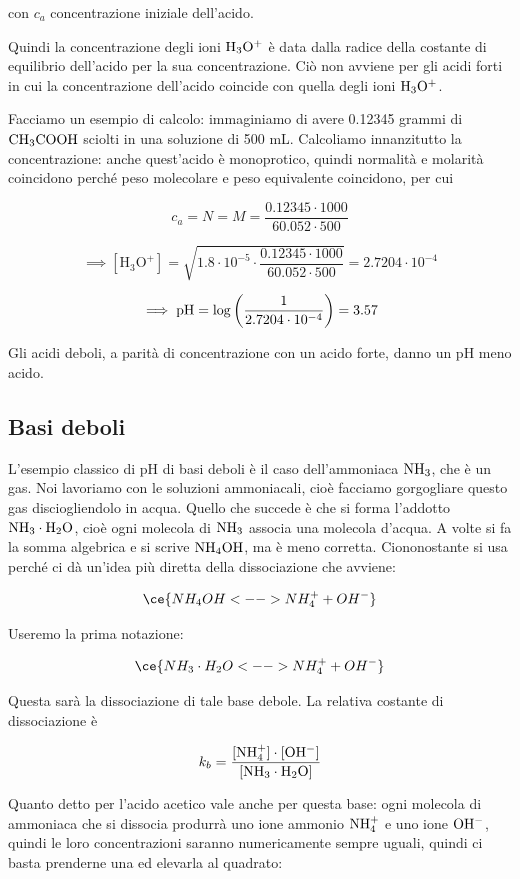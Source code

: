 con $c_a$ concentrazione iniziale dell'acido.

Quindi la concentrazione degli ioni $\rm H_3O^+$ è data dalla radice della costante di equilibrio dell'acido per la sua concentrazione. Ciò non avviene per gli acidi forti in cui la concentrazione dell'acido coincide con quella degli ioni $\rm H_3O^+$.

Facciamo un esempio di calcolo: immaginiamo di avere 0.12345 grammi di $\rm CH_3COOH$ sciolti in una soluzione di 500 mL. Calcoliamo innanzitutto la concentrazione: anche quest'acido è monoprotico, quindi normalità e molarità coincidono perché peso molecolare e peso equivalente coincidono, per cui

$$c_a=N=M=\frac{0.12345 \cdot 1000}{60.052 \cdot 500}$$

$$\implies [\text{H}_3\text{O}^+]=\sqrt{1.8 \cdot 10^{-5} \cdot \frac{0.12345 \cdot 1000}{60.052 \cdot 500}}=2.7204 \cdot 10^{-4}$$

$$\implies \rm pH=\log \left( \frac{1}{2.7204 \cdot 10^{-4}} \right)=3.57$$

Gli acidi deboli, a parità di concentrazione con un acido forte, danno un pH meno acido. 

\subsection{Basi deboli}

L'esempio classico di pH di basi deboli è il caso dell'ammoniaca $\rm NH_3$, che è un gas. Noi lavoriamo con le soluzioni ammoniacali, cioè facciamo gorgogliare questo gas disciogliendolo in acqua. Quello che succede è che si forma l'addotto $\rm NH_3 \cdot H_2O$, cioè ogni molecola di $\rm NH_3$ associa una molecola d'acqua. A volte si fa la somma algebrica e si scrive $\rm NH_4OH$, ma è meno corretta. Ciononostante si usa perché ci dà un'idea più diretta della dissociazione che avviene:

$$\ce{NH_4OH <--> NH_4^+ + OH^-}$$

Useremo la prima notazione:

$$\ce{NH_3 \cdot H_2O <--> NH_4^+ + OH^-}$$

Questa sarà la dissociazione di tale base debole. La relativa costante di dissociazione è

$$k_b= \frac{\rm{[NH_4^+] \cdot [OH^-]}}{\rm{[NH_3 \cdot H_2O]}}$$

Quanto detto per l'acido acetico vale anche per questa base: ogni molecola di ammoniaca che si dissocia produrrà uno ione ammonio $\rm NH_4^+$ e uno ione $\rm OH^-$, quindi le loro concentrazioni saranno numericamente sempre uguali, quindi ci basta prenderne una ed elevarla al quadrato:

